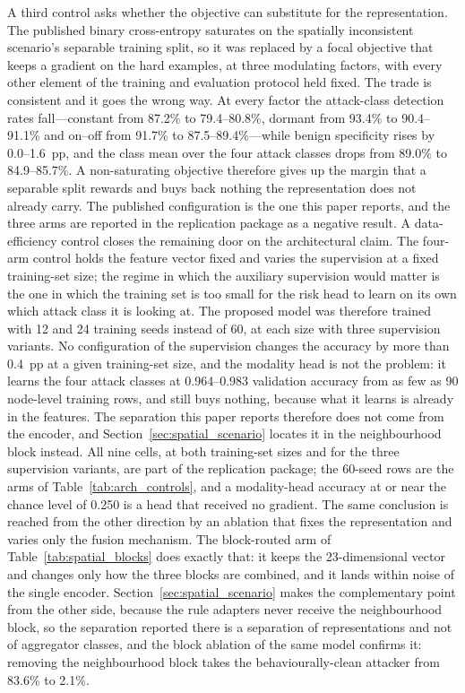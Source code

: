 \documentclass[notspecified,article,submit,moreauthors]{Definitions/mdpi}
\begin{document}
A third control asks whether the objective can substitute for the representation. The published binary cross-entropy saturates on the spatially inconsistent scenario's separable training split, so it was replaced by a focal objective that keeps a gradient on the hard examples, at three modulating factors, with every other element of the training and evaluation protocol held fixed. The trade is consistent and it goes the wrong way. At every factor the attack-class detection rates fall---constant from 87.2\% to 79.4--80.8\%, dormant from 93.4\% to 90.4--91.1\% and on--off from 91.7\% to 87.5--89.4\%---while benign specificity rises by 0.0--1.6~pp, and the class mean over the four attack classes drops from 89.0\% to 84.9--85.7\%. A non-saturating objective therefore gives up the margin that a separable split rewards and buys back nothing the representation does not already carry. The published configuration is the one this paper reports, and the three arms are reported in the replication package as a negative result.
A data-efficiency control closes the remaining door on the architectural claim. The four-arm control holds the feature vector fixed and varies the supervision at a fixed training-set size; the regime in which the auxiliary supervision would matter is the one in which the training set is too small for the risk head to learn on its own which attack class it is looking at. The proposed model was therefore trained with 12 and 24 training seeds instead of 60, at each size with three supervision variants. No configuration of the supervision changes the accuracy by more than 0.4~pp at a given training-set size, and the modality head is not the problem: it learns the four attack classes at 0.964--0.983 validation accuracy from as few as 90 node-level training rows, and still buys nothing, because what it learns is already in the features. The separation this paper reports therefore does not come from the encoder, and Section~\ref{sec:spatial_scenario} locates it in the neighbourhood block instead. All nine cells, at both training-set sizes and for the three supervision variants, are part of the replication package; the 60-seed rows are the arms of Table~\ref{tab:arch_controls}, and a modality-head accuracy at or near the chance level of 0.250 is a head that received no gradient.
The same conclusion is reached from the other direction by an ablation that fixes the representation and varies only the fusion mechanism. The block-routed arm of Table~\ref{tab:spatial_blocks} does exactly that: it keeps the 23-dimensional vector and changes only how the three blocks are combined, and it lands within noise of the single encoder. Section~\ref{sec:spatial_scenario} makes the complementary point from the other side, because the rule adapters never receive the neighbourhood block, so the separation reported there is a separation of representations and not of aggregator classes, and the block ablation of the same model confirms it: removing the neighbourhood block takes the behaviourally-clean attacker from 83.6\% to 2.1\%.
\end{document}
